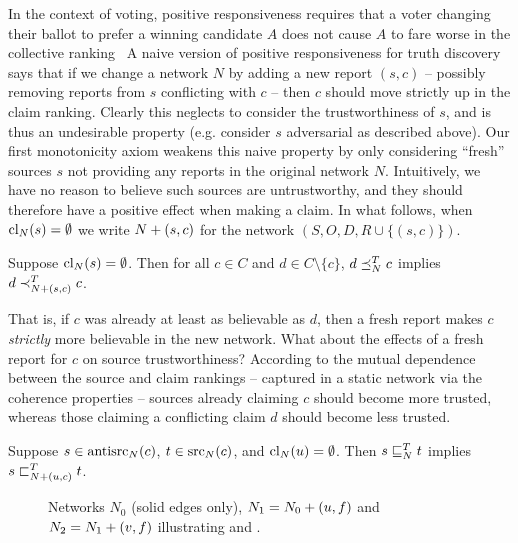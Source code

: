 In the context of voting, positive responsiveness requires that a voter
changing their ballot to prefer a winning candidate $A$ does not cause $A$ to
fare worse in the collective ranking~\cite{zwicker2016voting}
%
A naive version of positive responsiveness for truth discovery says that if we
change a network $N$ by adding a new report $(s, c)$ -- possibly removing
reports from $s$ conflicting with $c$ -- then $c$ should move strictly up in
the claim ranking. Clearly this neglects to consider the trustworthiness of
$s$, and is thus an undesirable property (e.g. consider $s$ adversarial as
described above). Our first monotonicity axiom weakens this naive property by
only considering ``fresh'' sources $s$ not providing any reports in the original
network $N$. Intuitively, we have no reason to believe such sources are
untrustworthy, and they should therefore have a positive effect when making a
claim.
%
In what follows, when $\operatorname{cl}_N(s) = \emptyset$ we write ${N} + ({s}, {c})$
for the network $(S, O, D, R \cup \{(s, c)\})$.

\begin{axiom}[\freshposresp{}]
    Suppose $\operatorname{cl}_N(s) = \emptyset$. Then for all $c \in C$ and $d \in C
    \setminus \{c\}$, $d \preceq_N^T c$ implies $d \prec_{{N} + ({s}, {c})}^T c$.
\end{axiom}

That is, if $c$ was already at least as believable as $d$, then a fresh report
makes $c$ \emph{strictly} more believable in the new network.\footnotemark{}
%
What about the effects of a fresh report for $c$ on source trustworthiness?
According to the mutual dependence between the source and claim rankings --
captured in a static network via the coherence properties -- sources already
claiming $c$ should become more trusted, whereas those claiming a conflicting
claim $d$ should become less trusted.


\begin{axiom}[\sourceposresp{}]
    Suppose $s \in \operatorname{antisrc}_N(c)$, $t \in \operatorname{src}_N(c)$, and $\operatorname{cl}_N(u) =
    \emptyset$. Then $s \sqsubseteq_N^T t$ implies $s \sqsubset_{{N} + ({u}, {c})}^T t$.
\end{axiom}

\begin{figure}
    \centering
    \caption{
        Networks $N_0$ (solid edges only), $N_1 = {N_0} + ({u}, {f})$ and
        $N_2 = {N_1} + ({v}, {f})$ illustrating \freshposresp{} and
        \sourceposresp{}.
    }
    \label{td_new_fig_sourceposresp_example}
\end{figure}

